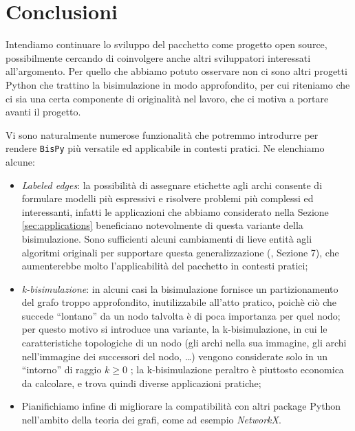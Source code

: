 \section{Conclusioni}
\label{sec:conclusions}
Intendiamo continuare lo sviluppo del pacchetto come progetto open source, possibilmente cercando di coinvolgere anche altri sviluppatori interessati all'argomento. Per quello che abbiamo potuto osservare non ci sono altri progetti Python che trattino la bisimulazione in modo approfondito, per cui riteniamo che ci sia una certa componente di originalità nel lavoro, che ci motiva a portare avanti il progetto.

Vi sono naturalmente numerose funzionalità che potremmo introdurre per rendere \texttt{BisPy} più versatile ed applicabile in contesti pratici. Ne elenchiamo alcune:
\begin{itemize}
    \item \emph{Labeled edges}: la possibilità di assegnare etichette agli archi consente di formulare modelli più espressivi e risolvere problemi più complessi ed interessanti, infatti le applicazioni che abbiamo considerato nella Sezione \ref{sec:applications} beneficiano notevolmente di questa variante della bisimulazione. Sono sufficienti alcuni cambiamenti di lieve entità agli algoritmi originali per supportare questa generalizzazione (\cite{dovier}, Sezione 7), che aumenterebbe molto l'applicabilità del pacchetto in contesti pratici;
    \item \emph{k-bisimulazione}: in alcuni casi la bisimulazione fornisce un partizionamento del grafo troppo approfondito, inutilizzabile all'atto pratico, poichè ciò che succede ``lontano'' da un nodo talvolta è di poca importanza per quel nodo; per questo motivo si introduce una variante, la k-bisimulazione, in cui le caratteristiche topologiche di un nodo (gli archi nella sua immagine, gli archi nell'immagine dei successori del nodo, \dots) vengono considerate solo in un ``intorno'' di raggio $k \geq 0$ \cite{kbisi}; la k-bisimulazione peraltro è piuttosto economica da calcolare, e trova quindi diverse applicazioni pratiche;
    \item Pianifichiamo infine di migliorare la compatibilità con altri package Python nell'ambito della teoria dei grafi, come ad esempio \emph{NetworkX}.
\end{itemize}
